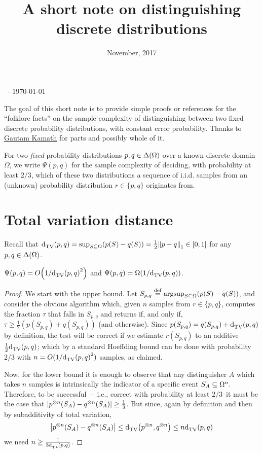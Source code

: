 \documentclass[10pt]{article}
\title{A short note on distinguishing discrete distributions}
\date{November, 2017}
\begin{document}
\begin{flushleft}\sf\footnotesize
\makeatletter
\@date~- \today \hfill \@title
\makeatother
\end{flushleft}
\vspace{5mm}

The goal of this short note is to provide simple proofs or references for the ``folklore facts'' on the sample complexity of distinguishing between two fixed discrete probability distributions, with constant error probability. Thanks to \href{http://www.gautamkamath.com/}{Gautam Kamath} for parts and possibly whole of it.\bigskip

For two \emph{fixed} probability distributions $p,q\in\Delta\!\left(\Omega\right)$ over a known discrete domain $\Omega$, we write $\Psi(p,q)$ for the sample complexity of deciding, with probability at least $2/3$, which of these two distributions a sequence of i.i.d. samples from an (unknown) probability distribution $r\in\{p,q\}$ originates from.
\section{Total variation distance}

Recall that ${\operatorname{d}_{\rm TV}^{}\!\left({p, q}\right)} = \sup_{S\subseteq \Omega} (p(S)-q(S)) = \frac{1}{2}{\lVert p-q{\rVert}}_1\in[0,1]$ for any $p,q\in\Delta\!\left(\Omega\right)$. 

\begin{theorem}\label{theo:testing:tv}
  $\Psi(p,q) = \bigO{1/\totalvardist{p}{q}^2}$ and $\Psi(p,q) = \bigOmega{1/\totalvardist{p}{q}}$.
\end{theorem}
\begin{proof}
  We start with the upper bound. Let $S_{p,q}\stackrel{\rm def}{=} \arg\!\sup_{S\subseteq \Omega} (p(S)-q(S))$, and consider the obvious algorithm which, given $n$ samples from $r\in\{p,q\}$, computes the fraction $\tau$ that falls in $S_{p,q}$ and returns \accept if, and only if, $\tau \geq \frac{1}{2}\left(p(S_{p,q})+q(S_{p,q})\right)$ (and \reject otherwise). Since $p(S_{p,q}) = q(S_{p,q})+{\operatorname{d}_{\rm TV}^{}\!\left({p, q}\right)}$ by definition, the test will be correct if we estimate $r(S_{p,q})$ to an additive $\frac{1}{2}{\operatorname{d}_{\rm TV}^{}\!\left({p, q}\right)}$; which by a standard Hoeffding bound can be done with probability $2/3$ with $n=O(1/{\operatorname{d}_{\rm TV}^{}\!\left({p, q}\right)}^2)$ samples, as claimed.
  
  Now, for the lower bound it is enough to observe that any distinguisher $A$ which takes $n$ samples is intrinsically the indicator of a specific event $S_A\subseteq \Omega^n$. Therefore, to be successful~--~i.e., correct with probability at least $2/3$--it must be the case that $\left\lvert  p^{\otimes n}(S_A)-q^{\otimes n}(S_A)  \right\rvert \geq \frac{1}{3}$. But since, again by definition and then by subadditivity of total variation,
  \[
        \left\lvert  p^{\otimes n}(S_A)-q^{\otimes n}(S_A)  \right\rvert \leq {\operatorname{d}_{\rm TV}^{}\!\left({p^{\otimes n}, q^{\otimes n}}\right)} \leq n {\operatorname{d}_{\rm TV}^{}\!\left({p, q}\right)}
  \]
  we need $n\geq \frac{1}{3 {\operatorname{d}_{\rm TV}^{}\!\left({p, q}\right)}}$.
\end{proof}
\end{document}
